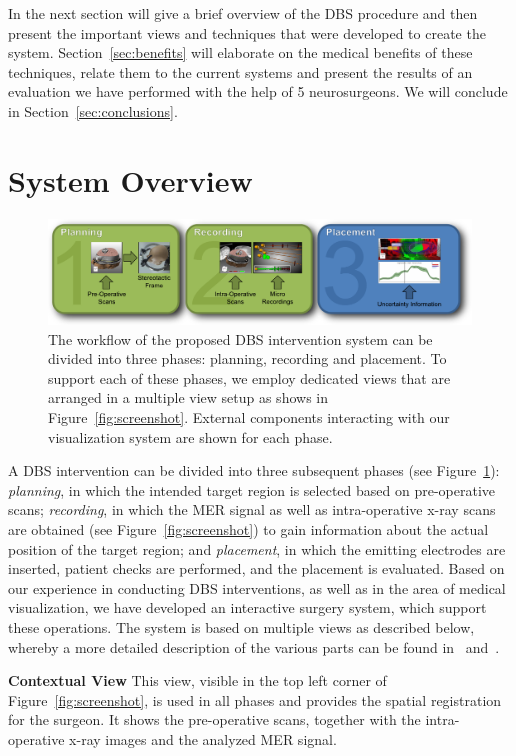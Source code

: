 \documentclass{egpubl}
\newcommand{\red}[1]{{\color{red}{#1}}}
\newcommand{\fix}[1]{\red{\emph{#1}}}
\begin{document}
In the next section will give a brief overview of the DBS procedure and then present the important views and techniques that were developed to create the system. Section~\ref{sec:benefits} will elaborate on the medical benefits of these techniques, relate them to the current systems and present the results of an evaluation we have performed with the help of 5 neurosurgeons. We will conclude in Section~\ref{sec:conclusions}. \fix{Sec evaluation}


\section{System Overview}\label{sec:setup}
\begin{figure}[t]
    \centering
    \includegraphics[width=0.95\linewidth]{figures/workflow}
    \caption{The workflow of the proposed DBS intervention system can be divided into three phases: planning, recording and placement. To support each of these phases, we employ dedicated views that are arranged in a multiple view setup as shows in Figure~\ref{fig:screenshot}. External components interacting with our visualization system are shown for each phase.}
    \label{fig:workflow}
\end{figure}

A DBS intervention can be divided into three subsequent phases (see Figure~\ref{fig:workflow}): \emph{planning}, in which the intended target region is selected based on pre-operative scans; \emph{recording}, in which the MER signal as well as intra-operative x-ray scans are obtained (see Figure~\ref{fig:screenshot}) to gain information about the actual position of the target region; and \emph{placement}, in which the emitting electrodes are inserted, patient checks are performed, and the placement is evaluated. Based on our experience in conducting DBS interventions, as well as in the area of medical visualization, we have developed an interactive surgery system, which support these operations. The system is based on multiple views as described below, whereby a more detailed description of the various parts can be found in~\cite{Bock12} and~\cite{Bock13}.

\noindent \textbf{Contextual View} This view, visible in the top left corner of Figure~\ref{fig:screenshot}, is used in all phases and provides the spatial registration for the surgeon. It shows the pre-operative scans, together with the intra-operative x-ray images and the analyzed MER signal.
\end{document}
